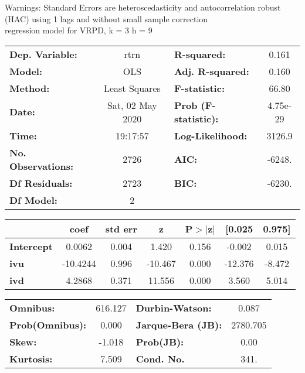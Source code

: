 Warnings: \newline
 [1] Standard Errors are heteroscedasticity and autocorrelation robust (HAC) using 1 lags and without small sample correction\\ 

regression model for VRPD, k = 3 h = 9\begin{center}
\begin{tabular}{lclc}
\toprule
\textbf{Dep. Variable:}    &       rtrn       & \textbf{  R-squared:         } &     0.161   \\
\textbf{Model:}            &       OLS        & \textbf{  Adj. R-squared:    } &     0.160   \\
\textbf{Method:}           &  Least Squares   & \textbf{  F-statistic:       } &     66.80   \\
\textbf{Date:}             & Sat, 02 May 2020 & \textbf{  Prob (F-statistic):} &  4.75e-29   \\
\textbf{Time:}             &     19:17:57     & \textbf{  Log-Likelihood:    } &    3126.9   \\
\textbf{No. Observations:} &        2726      & \textbf{  AIC:               } &    -6248.   \\
\textbf{Df Residuals:}     &        2723      & \textbf{  BIC:               } &    -6230.   \\
\textbf{Df Model:}         &           2      & \textbf{                     } &             \\
\bottomrule
\end{tabular}
\begin{tabular}{lcccccc}
                   & \textbf{coef} & \textbf{std err} & \textbf{z} & \textbf{P$> |$z$|$} & \textbf{[0.025} & \textbf{0.975]}  \\
\midrule
\textbf{Intercept} &       0.0062  &        0.004     &     1.420  &         0.156        &       -0.002    &        0.015     \\
\textbf{ivu}       &     -10.4244  &        0.996     &   -10.467  &         0.000        &      -12.376    &       -8.472     \\
\textbf{ivd}       &       4.2868  &        0.371     &    11.556  &         0.000        &        3.560    &        5.014     \\
\bottomrule
\end{tabular}
\begin{tabular}{lclc}
\textbf{Omnibus:}       & 616.127 & \textbf{  Durbin-Watson:     } &    0.087  \\
\textbf{Prob(Omnibus):} &   0.000 & \textbf{  Jarque-Bera (JB):  } & 2780.705  \\
\textbf{Skew:}          &  -1.018 & \textbf{  Prob(JB):          } &     0.00  \\
\textbf{Kurtosis:}      &   7.509 & \textbf{  Cond. No.          } &     341.  \\
\bottomrule
\end{tabular}
\end{center}

